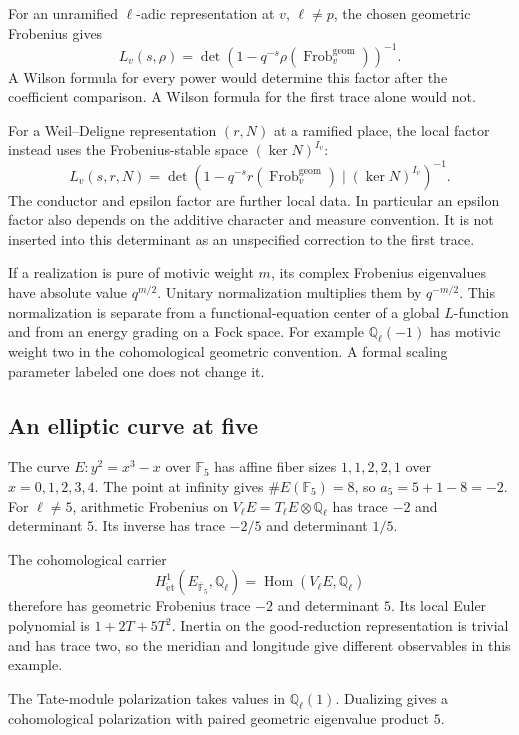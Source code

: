 For an unramified \(\ell\)-adic representation at \(v\), \(\ell\ne p\), the
chosen geometric Frobenius gives
\[
 L_v(s,\rho)=\det(1-q^{-s}\rho(\operatorname{Frob}^{\mathrm{geom}}_v))^{-1}.
\]
A Wilson formula for every power would determine this factor after the
coefficient comparison. A Wilson formula for the first trace alone would
not.

For a Weil--Deligne representation \((r,N)\) at a ramified place, the local
factor instead uses the Frobenius-stable space \((\ker N)^{I_v}\):
\[
 L_v(s,r,N)=\det(1-q^{-s}r(\operatorname{Frob}^{\mathrm{geom}}_v)
                                 \mid(\ker N)^{I_v})^{-1}.
\]
The conductor and epsilon factor are further local data. In particular an
epsilon factor also depends on the additive character and measure
convention. It is not inserted into this determinant as an unspecified
correction to the first trace.

If a realization is pure of motivic weight \(m\), its complex Frobenius
eigenvalues have absolute value \(q^{m/2}\). Unitary normalization
multiplies them by \(q^{-m/2}\). This normalization is separate from a
functional-equation center of a global \(L\)-function and from an energy
grading on a Fock space. For example \(\mathbb Q_\ell(-1)\) has motivic
weight two in the cohomological geometric convention. A formal scaling
parameter labeled one does not change it.

\subsection{An elliptic curve at five}

The curve \(E:y^2=x^3-x\) over \(\mathbb F_5\) has affine fiber sizes
\(1,1,2,2,1\) over \(x=0,1,2,3,4\). The point at infinity gives
\(\#E(\mathbb F_5)=8\), so \(a_5=5+1-8=-2\). For \(\ell\ne5\), arithmetic
Frobenius on \(V_\ell E=T_\ell E\otimes\mathbb Q_\ell\) has trace \(-2\) and
determinant \(5\). Its inverse has trace \(-2/5\) and determinant \(1/5\).

The cohomological carrier
\[
 H^1_{\mathrm{\acute et}}(E_{\overline{\mathbb F}_5},\mathbb Q_\ell)
       =\operatorname{Hom}(V_\ell E,\mathbb Q_\ell)
\]
therefore has geometric Frobenius trace \(-2\) and determinant \(5\). Its
local Euler polynomial is \(1+2T+5T^2\). Inertia on the good-reduction
representation is trivial and has trace two, so the meridian and longitude
give different observables in this example.

The Tate-module polarization takes values in \(\mathbb Q_\ell(1)\).
Dualizing gives a cohomological polarization with paired geometric
eigenvalue product \(5\).

